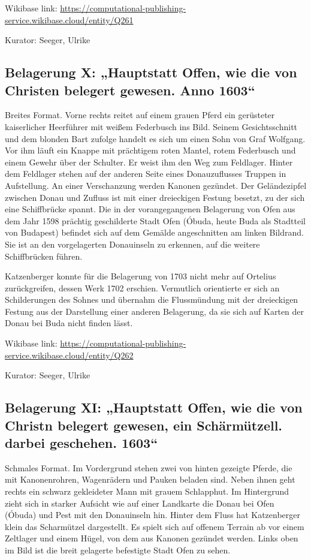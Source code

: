\documentclass[
  letterpaper,
]{book}
\begin{document}
Wikibase link:
\url{https://computational-publishing-service.wikibase.cloud/entity/Q261}

Kurator: Seeger, Ulrike

\subsection{Belagerung X: „Hauptstatt Offen, wie die von Christen
belegert gewesen. Anno
1603``}\label{belagerung-x-hauptstatt-offen-wie-die-von-christen-belegert-gewesen.-anno-1603}

Breites Format. Vorne rechts reitet auf einem grauen Pferd ein
gerüsteter kaiserlicher Heerführer mit weißem Federbusch ins Bild.
Seinem Gesichtsschnitt und dem blonden Bart zufolge handelt es sich um
einen Sohn von Graf Wolfgang. Vor ihm läuft ein Knappe mit prächtigem
roten Mantel, rotem Federbusch und einem Gewehr über der Schulter. Er
weist ihm den Weg zum Feldlager. Hinter dem Feldlager stehen auf der
anderen Seite eines Donauzuflusses Truppen in Aufstellung. An einer
Verschanzung werden Kanonen gezündet. Der Geländezipfel zwischen Donau
und Zufluss ist mit einer dreieckigen Festung besetzt, zu der sich eine
Schiffbrücke spannt. Die in der vorangegangenen Belagerung von Ofen aus
dem Jahr 1598 prächtig geschilderte Stadt Ofen (Óbuda, heute Buda als
Stadtteil von Budapest) befindet sich auf dem Gemälde angeschnitten am
linken Bildrand. Sie ist an den vorgelagerten Donauinseln zu erkennen,
auf die weitere Schiffbrücken führen.

Katzenberger konnte für die Belagerung von 1703 nicht mehr auf Ortelius
zurückgreifen, dessen Werk 1702 erschien. Vermutlich orientierte er sich
an Schilderungen des Sohnes und übernahm die Flussmündung mit der
dreieckigen Festung aus der Darstellung einer anderen Belagerung, da sie
sich auf Karten der Donau bei Buda nicht finden lässt.

Wikibase link:
\url{https://computational-publishing-service.wikibase.cloud/entity/Q262}

Kurator: Seeger, Ulrike

\subsection{Belagerung XI: „Hauptstatt Offen, wie die von Christn
belegert gewesen, ein Schärmützell. darbei geschehen.
1603``}\label{belagerung-xi-hauptstatt-offen-wie-die-von-christn-belegert-gewesen-ein-schuxe4rmuxfctzell.-darbei-geschehen.-1603}

Schmales Format. Im Vordergrund stehen zwei von hinten gezeigte Pferde,
die mit Kanonenrohren, Wagenrädern und Pauken beladen sind. Neben ihnen
geht rechts ein schwarz gekleideter Mann mit grauem Schlapphut. Im
Hintergrund zieht sich in starker Aufsicht wie auf einer Landkarte die
Donau bei Ofen (Óbuda) und Pest mit den Donauinseln hin. Hinter dem
Fluss hat Katzenberger klein das Scharmützel dargestellt. Es spielt sich
auf offenem Terrain ab vor einem Zeltlager und einem Hügel, von dem aus
Kanonen gezündet werden. Links oben im Bild ist die breit gelagerte
befestigte Stadt Ofen zu sehen.
\end{document}

